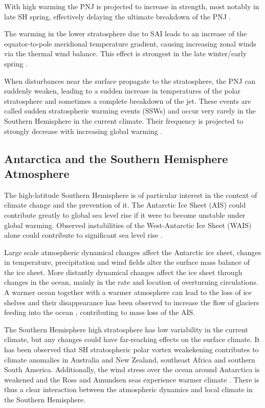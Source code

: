 With high warming the PNJ is projected to increase in strength, most notably in late SH spring, effectively delaying the ultimate breakdown of the PNJ \parencite{ceppi2019}.

The warming in the lower stratosphere due to SAI leads to an increase of the equator-to-pole meridional temperature gradient, causing increasing zonal winds via the thermal wind balance. This effect is strongest in the late winter/early spring \parencite{bednarz2023injection,bednarz2023ozone}.

When disturbances near the surface propagate to the stratosphere, the PNJ can suddenly weaken, leading to a sudden increase in temperatures of the polar stratosphere and sometimes a complete breakdown of the jet. These events are called sudden stratospheric warming events (SSWs) and occur very rarely in the Southern Hemisphere in the current climate. Their frequency is projected to strongly decrease with increasing global warming \parencite{jucker2021}. 


\subsection{Antarctica and the Southern Hemisphere Atmosphere}
The high-latitude Southern Hemisphere is of particular interest in the context of climate change and the prevention of it. The Antarctic Ice Sheet (AIS) could contribute greatly to global sea level rise if it were to become unstable under global warming. Observed instabilities of the West-Antarctic Ice Sheet (WAIS) alone could contribute to significant sea level rise \parencite{IPCC_2021_WGI_Ch_9}. 

Large scale atmospheric dynamical changes affect the Antarctic ice sheet, changes in temperature, precipitation and wind fields alter the surface mass balance of the ice sheet. More distantly dynamical changes affect the ice sheet through changes in the ocean, mainly in the rate and location of overturning circulations. A warmer ocean together with a warmer atmosphere can lead to the loss of ice shelves \parencite{WANG2023} and their disappearance has been observed to increase the flow of glaciers feeding into the ocean \parencite{scambos2004}, contributing to mass loss of the AIS. 

The Southern Hemisphere high stratosphere has low variability in the current climate, but any changes could have far-reaching effects on the surface climate. It has been observed that SH stratospheric polar vortex weakekening contributes to climate anomalies in Australia and New Zealand, southeast Africa and southern South America. Additionally, the wind stress over the ocean around Antarctica is weakened and the Ross and Amundsen seas experience warmer climate \parencite{domeisen2020}. There is thus a clear interaction between the atmospheric dynamics and local climate in the Southern Hemisphere. 

